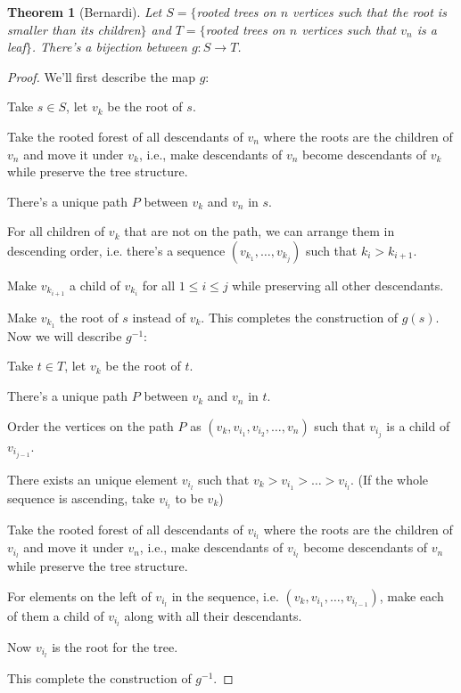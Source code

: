 \documentclass[10pt,a4paper]{amsart}
\newtheorem{thm}{Theorem}
\begin{document}
\begin{thm}[Bernardi] \label{Bernardi}
    Let $S=\{$rooted trees on $n$ vertices such that the root is smaller than its children$\}$ and 
    $T=\{$rooted trees on $n$ vertices such that $v_n$ is a leaf$\}$. There's a bijection between $g: S \rightarrow T$.
\end{thm}

\begin{proof}
    We'll first describe the map $g$:
    
    Take $s \in S$, let $v_k$ be the root of $s$.

    Take the rooted forest of all descendants of $v_n$ where the roots are the children of $v_n$ and move it under $v_k$, i.e., make descendants of $v_n$ become descendants of $v_k$ while preserve the tree structure.

    There's a unique path $P$ between $v_k$ and $v_n$ in $s$.

    For all children of $v_k$ that are not on the path, we can arrange them in descending order, i.e. there's a sequence $(v_{k_1},\dots,v_{k_j})$ such that $k_i > k_{i+1}$.

    Make $v_{k_{i+1}}$ a child of $v_{k_i}$ for all $1 \leq i \leq j$ while preserving all other descendants.
    
    Make $v_{k_1}$ the root of $s$ instead of $v_k$. This completes the construction of $g(s)$.\\

    Now we will describe $g^{-1}$:

    Take $t \in T$, let $v_k$ be the root of $t$.

    There's a unique path $P$ between $v_k$ and $v_n$ in $t$.

    Order the vertices on the path $P$ as $(v_k,v_{i_1},v_{i_2},\dots,v_n)$ such that $v_{i_j}$ is a child of $v_{i_{j-1}}$.

    There exists an unique element $v_{i_l}$ such that $v_k > v_{i_1} > \dots > v_{i_l}$. (If the whole sequence is ascending, take $v_{i_l}$ to be $v_k$)

    Take the rooted forest of all descendants of $v_{i_l}$ where the roots are the children of $v_{i_l}$ and move it under $v_n$, i.e., make descendants of $v_{i_l}$ become descendants of $v_n$ while preserve the tree structure.

    For elements on the left of $v_{i_l}$ in the sequence, i.e. $(v_k,v_{i_1},\dots,v_{i_{l-1}})$, make each of them a child of $v_{i_l}$ along with all their descendants.

    Now $v_{i_l}$ is the root for the tree.

    This complete the construction of $g^{-1}$.
\end{proof}
\end{document}

